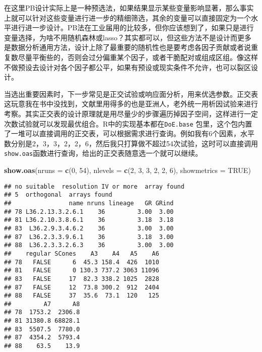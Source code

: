 \documentclass[]{tufte-book}
\newenvironment{Shaded}{}{}
\newcommand{\DataTypeTok}[1]{\textcolor[rgb]{0.56,0.13,0.00}{#1}}
\newcommand{\DecValTok}[1]{\textcolor[rgb]{0.25,0.63,0.44}{#1}}
\newcommand{\KeywordTok}[1]{\textcolor[rgb]{0.00,0.44,0.13}{\textbf{#1}}}
\newcommand{\NormalTok}[1]{#1}
\newcommand{\OtherTok}[1]{\textcolor[rgb]{0.00,0.44,0.13}{#1}}
\begin{document}
在这里PB设计实际上是一种预选法，如果结果显示某些变量影响显著，那么事实上就可以针对这些变量进行进一步的精细筛选，其余的变量可以直接固定为一个水平进行进一步设计。PB法在工业届用的比较多，但你应该想到了，如果只是进行变量选择，为啥不用随机森林或lasso？其实都可以，但这些方法不是设计而更多是数据分析通用方法，设计上除了最重要的随机性也是要考虑各因子贡献或者说重复数尽量平衡些的，否则会过分偏重某个因子，或者干脆配对或组成区组。像这样不做预设去设计对各个因子都公平，如果有预设或现实条件不允许，也可以裂区设计。

当选出重要因素时，下一步常见是正交试验或响应面分析，用来优选参数。正交表这玩意我在书中没找到，文献里用得多的也是亚洲人，老外统一用析因试验来进行考察。其实正交表的设计原理就是用尽量少的步骤遍历掉因子空间，这样进行一定次数试验就可以发现最优组合。R中的实现基本都在\texttt{DoE.base} 包里，这个包内置了一堆可以直接调用的正交表，可以根据需求进行查询。例如我有6个因素，水平数分别是2，3，3，2，2，6，然后我只打算做不超过54次试验，这时可以直接调用\texttt{show.oas}函数进行查询，给出的正交表随意选一个就可以继续。

\begin{Shaded}
\begin{Highlighting}[]
\KeywordTok{show.oas}\NormalTok{(}\DataTypeTok{nruns =} \KeywordTok{c}\NormalTok{(}\DecValTok{0}\NormalTok{, }\DecValTok{54}\NormalTok{), }\DataTypeTok{nlevels =} \KeywordTok{c}\NormalTok{(}\DecValTok{2}\NormalTok{, }\DecValTok{3}\NormalTok{, }\DecValTok{3}\NormalTok{, }
    \DecValTok{2}\NormalTok{, }\DecValTok{2}\NormalTok{, }\DecValTok{6}\NormalTok{), }\DataTypeTok{showmetrics =} \OtherTok{TRUE}\NormalTok{)}
\end{Highlighting}
\end{Shaded}

\begin{verbatim}
## no suitable  resolution IV or more  array found
## 5  orthogonal  arrays found
##                name nruns lineage   GR GRind
## 78 L36.2.13.3.2.6.1    36         3.00  3.00
## 81 L36.2.10.3.8.6.1    36         3.18  3.18
## 83  L36.2.9.3.4.6.2    36         3.00  3.00
## 87  L36.2.3.3.9.6.1    36         3.18  3.00
## 88  L36.2.3.3.2.6.3    36         3.00  3.00
##    regular SCones    A3    A4   A5    A6
## 78   FALSE      6  45.3 158.4  426  1010
## 81   FALSE      0 130.3 737.2 3063 11096
## 83   FALSE     17  82.3 338.2 1025  2828
## 87   FALSE     12  73.8 300.2  912  2404
## 88   FALSE     37  35.6  73.1  120   125
##         A7      A8
## 78  1753.2  2306.8
## 81 31380.8 68828.1
## 83  5507.5  7780.0
## 87  4354.2  5793.4
## 88    63.5    13.9
\end{verbatim}
\end{document}
